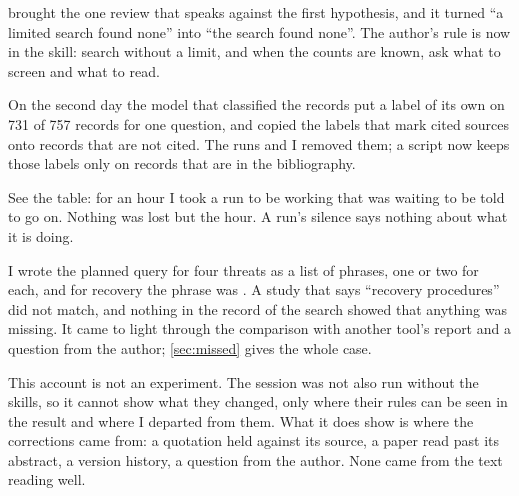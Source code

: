 \begin{description}
    brought the one review that speaks against the first hypothesis,
    and it turned \enquote{a limited search found none} into
    \enquote{the search found none}.
    The author's rule is now in the skill: search without a limit, and
    when the counts are known, ask what to screen and what to read.
  \item[Labels that the model made up] On the second day the model that
    classified the records put a label of its own on 731 of 757
    records for one question, and copied the labels that mark cited
    sources onto records that are not cited.
    The runs and I removed them; a script now keeps those labels only
    on records that are in the bibliography.
  \item[A run that stopped without saying so] See the table: for an
    hour I took a run to be working that was waiting to be told to go
    on.
    Nothing was lost but the hour.
    A run's silence says nothing about what it is doing.
  \item[A threat that I searched with one phrase] I wrote the planned
    query for four threats as a list of phrases, one or two for each,
    and for recovery the phrase was .
    A study that says \enquote{recovery procedures} did not match, and
    nothing in the record of the search showed that anything was
    missing.
    It came to light through the comparison with another tool's report
    and a question from the author; \cref{sec:missed} gives the whole
    case.
\end{description}

This account is not an experiment.
The session was not also run without the skills, so it cannot show what
they changed, only where their rules can be seen in the result and where
I departed from them.
What it does show is where the corrections came from: a quotation held
against its source, a paper read past its abstract, a version history,
a question from the author.
None came from the text reading well.


